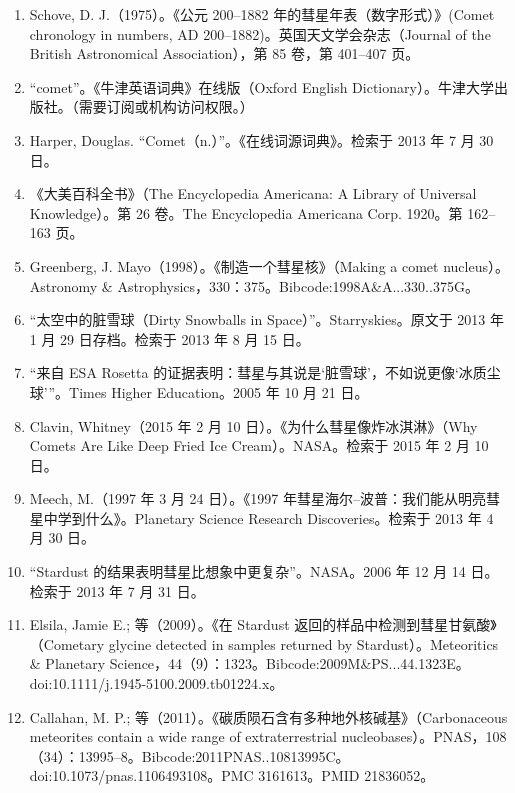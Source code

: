 \begin{enumerate}
\item Schove, D. J.（1975）。《公元 200–1882 年的彗星年表（数字形式）》(Comet chronology in numbers, AD 200–1882)。英国天文学会杂志（Journal of the British Astronomical Association），第 85 卷，第 401–407 页。

\item “comet”。《牛津英语词典》在线版（Oxford English Dictionary）。牛津大学出版社。（需要订阅或机构访问权限。）

\item Harper, Douglas. “Comet（n.）”。《在线词源词典》。检索于 2013 年 7 月 30 日。

\item 《大美百科全书》（The Encyclopedia Americana: A Library of Universal Knowledge）。第 26 卷。The Encyclopedia Americana Corp. 1920。第 162–163 页。

\item Greenberg, J. Mayo（1998）。《制造一个彗星核》（Making a comet nucleus）。Astronomy & Astrophysics，330：375。Bibcode:1998A&A...330..375G。

\item “太空中的脏雪球（Dirty Snowballs in Space）”。Starryskies。原文于 2013 年 1 月 29 日存档。检索于 2013 年 8 月 15 日。

\item “来自 ESA Rosetta 的证据表明：彗星与其说是‘脏雪球’，不如说更像‘冰质尘球’”。Times Higher Education。2005 年 10 月 21 日。

\item Clavin, Whitney（2015 年 2 月 10 日）。《为什么彗星像炸冰淇淋》（Why Comets Are Like Deep Fried Ice Cream）。NASA。检索于 2015 年 2 月 10 日。

\item Meech, M.（1997 年 3 月 24 日）。《1997 年彗星海尔–波普：我们能从明亮彗星中学到什么》。Planetary Science Research Discoveries。检索于 2013 年 4 月 30 日。

\item “Stardust 的结果表明彗星比想象中更复杂”。NASA。2006 年 12 月 14 日。检索于 2013 年 7 月 31 日。

\item Elsila, Jamie E.; 等（2009）。《在 Stardust 返回的样品中检测到彗星甘氨酸》（Cometary glycine detected in samples returned by Stardust）。Meteoritics & Planetary Science，44（9）：1323。Bibcode:2009M&PS...44.1323E。doi:10.1111/j.1945-5100.2009.tb01224.x。

\item Callahan, M. P.; 等（2011）。《碳质陨石含有多种地外核碱基》（Carbonaceous meteorites contain a wide range of extraterrestrial nucleobases）。PNAS，108（34）：13995–8。Bibcode:2011PNAS..10813995C。doi:10.1073/pnas.1106493108。PMC 3161613。PMID 21836052。


\end{enumerate}
